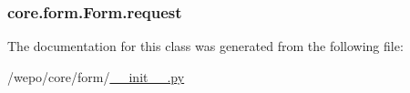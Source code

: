 \hypertarget{classcore_1_1form_1_1Form_a0046020aebc28839db2ccb6c354700c0}{
\subsubsection[{request}]{\setlength{\rightskip}{0pt plus 5cm}core.\-form.\-Form.\-request}}\label{classcore_1_1form_1_1Form_a0046020aebc28839db2ccb6c354700c0}


The documentation for this class was generated from the following file\-:\begin{DoxyCompactItemize}
\item 
/wepo/core/form/\hyperlink{core_2form_2____init_____8py}{\-\_\-\-\_\-init\-\_\-\-\_\-.\-py}\end{DoxyCompactItemize}
